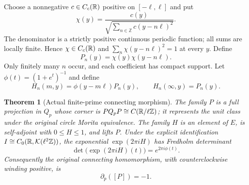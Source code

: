 \documentclass[11pt]{article}
\newtheorem{theorem}{Theorem}[section]
\begin{document}
Choose a nonnegative $c\in C_c(\mathbb R)$ positive on $[-\ell,\ell]$ and
put
\[
 \chi(y)=\frac{c(y)}{\sqrt{\sum_{n\in\mathbb Z}c(y-n\ell)^2}}.
\]
The denominator is a strictly positive continuous periodic function;
all sums are locally finite. Hence $\chi\in C_c(\mathbb R)$ and
$\sum_n\chi(y-n\ell)^2=1$ at every $y$. Define
\[
 P_n(y)=\chi(y)\chi(y-n\ell).
 \tag{K3}
\]
Only finitely many $n$ occur, and each coefficient has compact support.
Let $\phi(t)=(1+e^t)^{-1}$ and define
\[
 H_n(m,y)=\phi(y-m\ell)P_n(y),\qquad
 H_n(\infty,y)=P_n(y).
 \tag{K4}
\]

\begin{theorem}[Actual finite-prime connecting morphism]
The family $P$ is a full projection in $Q_p$ whose corner is
$P Q_pP\cong C(\mathbb R/\ell\mathbb Z)$; it represents the unit class
under the original circle Morita equivalence. The family $H$ is an
element of $E$, is self-adjoint with $0\leq H\leq1$, and lifts $P$.
Under the explicit identification $I\cong C_0(\mathbb R,\mathcal K(\ell^2\mathbb Z))$,
the exponential $\exp(2\pi iH)$ has Fredholm determinant
\[
 \det\bigl(\exp(2\pi iH)(t)\bigr)=e^{2\pi i\phi(t)}.
\]
Consequently the original connecting homomorphism, with
counterclockwise winding positive, is
\[
 \boxed{\partial_p([P])=-1.}\tag{K5}
\]
\end{theorem}
\end{document}
